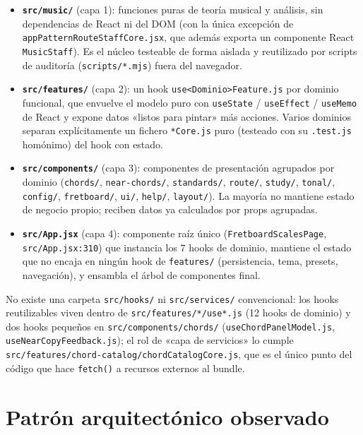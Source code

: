 \documentclass[a4paper,11pt,oneside]{report}
\begin{document}
\begin{itemize}
\item \textbf{\lstinline!src/music/!} (capa 1): funciones puras de teoría musical y análisis, sin dependencias de React ni del DOM (con la única excepción de \lstinline!appPatternRouteStaffCore.jsx!, que además exporta un componente React \lstinline!MusicStaff!). Es el núcleo testeable de forma aislada y reutilizado por scripts de auditoría (\lstinline!scripts/*.mjs!) fuera del navegador.
\item \textbf{\lstinline!src/features/!} (capa 2): un hook \lstinline!use<Dominio>Feature.js! por dominio funcional, que envuelve el modelo puro con \lstinline!useState! / \lstinline!useEffect! / \lstinline!useMemo! de React y expone datos «listos para pintar» más acciones. Varios dominios separan explícitamente un fichero \lstinline!*Core.js! puro (testeado con su \lstinline!.test.js! homónimo) del hook con estado.
\item \textbf{\lstinline!src/components/!} (capa 3): componentes de presentación agrupados por dominio (\lstinline!chords/!, \lstinline!near-chords/!, \lstinline!standards/!, \lstinline!route/!, \lstinline!study/!, \lstinline!tonal/!, \lstinline!config/!, \lstinline!fretboard/!, \lstinline!ui/!, \lstinline!help/!, \lstinline!layout/!). La mayoría no mantiene estado de negocio propio; reciben datos ya calculados por props agrupadas.
\item \textbf{\lstinline!src/App.jsx!} (capa 4): componente raíz único (\lstinline!FretboardScalesPage!, \lstinline!src/App.jsx:310!) que instancia los 7 hooks de dominio, mantiene el estado que no encaja en ningún hook de \lstinline!features/! (persistencia, tema, presets, navegación), y ensambla el árbol de componentes final.
\end{itemize}

No existe una carpeta \lstinline!src/hooks/! ni \lstinline!src/services/! convencional: los hooks reutilizables viven dentro de \lstinline!src/features/*/use*.js! (12 hooks de dominio) y dos hooks pequeños en \lstinline!src/components/chords/! (\lstinline!useChordPanelModel.js!, \lstinline!useNearCopyFeedback.js!); el rol de «capa de servicios» lo cumple \lstinline!src/features/chord-catalog/chordCatalogCore.js!, que es el único punto del código que hace \lstinline!fetch()! a recursos externos al bundle.

\section{Patrón arquitectónico observado}
\label{sec:2.2}
\end{document}
